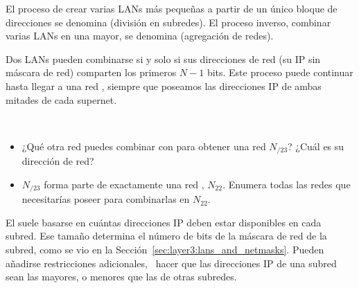 El proceso de crear varias LANs más pequeñas a partir de un único bloque de direcciones se denomina  (división en subredes).
El proceso inverso, combinar varias LANs en una mayor, se denomina  (agregación de redes). 

Dos LANs  pueden combinarse si y solo si sus direcciones de red 
(su IP sin máscara de red) comparten los primeros $N-1$ bits. Este proceso puede continuar hasta llegar 
a una red , siempre que poseamos las direcciones IP de ambas mitades de cada supernet.

\begin{exercise}\ \\[-0.5cm]
\begin{itemize}
\item ¿Qué otra red puedes combinar con 
para obtener una red  $N_{/23}$? ¿Cuál es su dirección de red?

\item $N_{/23}$ forma parte de exactamente una red , $N_{22}$. 
  Enumera todas las redes  que necesitarías poseer para combinarlas en $N_{22}$.
\end{itemize}
\end{exercise}

El  suele basarse en cuántas direcciones IP deben estar 
disponibles en cada subred. 
Ese tamaño determina el número de bits de la máscara de red de la subred, como se vio en la Sección~\ref{sec:layer3:lans_and_netmasks}.
Pueden añadirse restricciones adicionales, \eg\ hacer que las direcciones IP de una subred sean las mayores,
o menores que las de otras subredes. 

